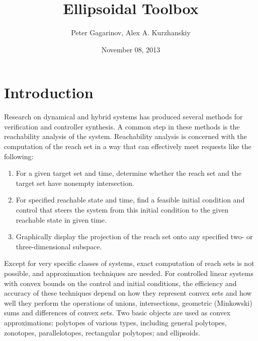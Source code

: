 \documentclass[letterpaper,10pt,english]{sphinxmanual}
\title{Ellipsoidal Toolbox}
\date{November 08, 2013}
\author{Peter Gagarinov, Alex A. Kurzhanskiy}
\begin{document}
\maketitle
\tableofcontents
{}\label{main_manual::doc}



\chapter{Introduction}
\label{main_source:introduction}\label{main_source::doc}\label{main_source:welcome-to-ellipsoidal-toolbox-documentation}
Research on dynamical and hybrid systems has produced several methods
for verification and controller synthesis. A common step in these
methods is the reachability analysis of the system. Reachability
analysis is concerned with the computation of the reach set in a way
that can effectively meet requests like the following:
\begin{enumerate}
\item {} 
For a given target set and time, determine whether the reach set and
the target set have nonempty intersection.

\item {} 
For specified reachable state and time, find a feasible initial
condition and control that steers the system from this initial
condition to the given reachable state in given time.

\item {} 
Graphically display the projection of the reach set onto any
specified two- or three-dimensional subspace.

\end{enumerate}

Except for very specific classes of systems, exact computation of reach
sets is not possible, and approximation techniques are needed. For
controlled linear systems with convex bounds on the control and initial
conditions, the efficiency and accuracy of these techniques depend on
how they represent convex sets and how well they perform the operations
of unions, intersections, geometric (Minkowski) sums and differences of
convex sets. Two basic objects are used as convex approximations:
polytopes of various types, including general polytopes, zonotopes,
parallelotopes, rectangular polytopes; and ellipsoids.
\end{document}
